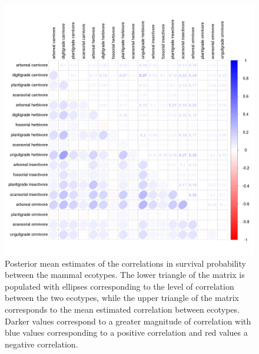 \afterpage{\clearpage}
\begin{figure}[p]
  \centering
  \includegraphics[width=\textwidth,height=\textheight,keepaspectratio=true]{chapter_coping/figure/survival_correlation}
  \caption[Estimated correlations in survival probability between ecotypes]{Posterior mean estimates of the correlations in survival probability between the mammal ecotypes. The lower triangle of the matrix is populated with ellipses corresponding to the level of correlation between the two ecotypes, while the upper triangle of the matrix corresponds to the mean estimated correlation between ecotypes. Darker values correspond to a greater magnitude of correlation with blue values corresponding to a positive correlation and red values a negative correlation.}
  \label{fig:survival_corr}
\end{figure}

